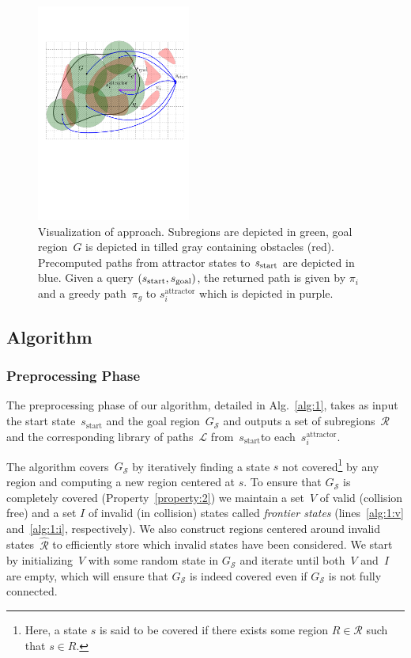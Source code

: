 \documentclass[letterpaper]{article} %
\newcommand{\calL}{\ensuremath{\mathcal{L}}\xspace}
\newcommand{\calS}{\ensuremath{\mathcal{S}}\xspace}
\newcommand{\calR}{\ensuremath{\mathcal{R}}\xspace}
\newcommand{\sAttract}{\ensuremath{s^{\text{attractor}}_i}\xspace}
\newcommand{\sStart}{\ensuremath{s_{\text{start}}\xspace}}
\begin{document}
\begin{figure}
\centering
\includegraphics[width=0.45\textwidth]{Approach-new.pdf}
  \caption{
  Visualization of approach. Subregions are depicted in green, 
  goal region~$G$ is depicted in tilled gray  containing obstacles (red).
  Precomputed paths from attractor states to $s_{\rm{start}}$ are depicted in blue.
 Given a query $(s_{\rm{start}}, s_{\rm{goal}})$, the returned path is given by $\pi_i$ and a greedy path~$\pi_g$ to \sAttract which is depicted in purple.
}
   	\label{fig:approach}
\end{figure}

\subsection {Algorithm}
\label{subsec:alg}
\subsubsection{Preprocessing Phase}
The preprocessing phase of our algorithm, detailed in Alg.~\ref{alg:1}, takes as input the start state~$\sStart$ and the goal region~$G_\calS$ and outputs a set of subregions~$\calR$ and the corresponding library of paths~$\calL$ from~\sStart to each~\sAttract. 

The algorithm covers~$G_\calS$ by iteratively finding a state $s$ not covered\footnote{Here, a state $s$ is said to be covered if there exists some region $R \in \calR$ such that $s \in R$.} by any region and computing a new region centered at $s$.
To ensure that $G_\calS$ is completely covered (Property~\ref{property:2}) we maintain a set~$V$ of valid (collision free) and a set $I$ of invalid (in collision) states called \emph{frontier states} (lines~\ref{alg:1:v} and~\ref{alg:1:i}, respectively).
We also construct regions centered around invalid states~$\hat{\calR}$ to efficiently store which invalid states have been considered.
We start by initializing~$V$ with some random state in $G_\calS$ and iterate until both~$V$ and~$I$ are empty, which will ensure that $G_\calS$ is indeed covered even if $G_\calS$ is not fully connected.
\end{document}
